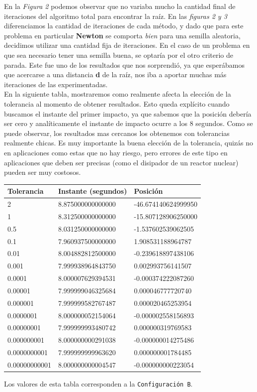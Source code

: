 \documentclass[a4paper]{article}
\begin{document}
En la \textit{Figura 2} podemos observar que no variaba mucho la cantidad final de iteraciones del algoritmo total para encontrar la raíz. En las \textit{figuras 2 y 3} diferenciamos la cantidad de iteraciones de cada método, y dado que para este problema en particular \textbf{Newton} se comporta \textit{bien} para una semilla aleatoria, decidimos utilizar una cantidad fija de iteraciones.
En el caso de un problema en que sea necesario tener una semilla buena, se optaría por el otro criterio de parada.
Este fue uno de los resultados que nos sorprendió, ya que esperábamos que acercarse a una distancia \textbf{d} de la raíz, nos iba a aportar muchas más iteraciones de las experimentadas.\\


En la siguiente tabla, mostraremos como realmente afecta la elección de la tolerancia al momento de obtener resultados. Esto queda explícito cuando buscamos el instante del primer impacto, ya que sabemos que la posición debería ser cero y analíticamente el instante de impacto ocurre a los 8 segundos. Como se puede observar, los resultados mas cercanos los obtenemos con tolerancias realmente chicas.
Es muy importante la buena elección de la tolerancia, quizás no en aplicaciones como estas que no hay riesgo, pero errores de este tipo en aplicaciones que deben ser precisas (como el disipador de un reactor nuclear) pueden ser muy costosos.

\vspace{2em}
\begin{center}
\begin{tabular}{|l|l|l|}
  \hline
  Tolerancia & Instante (segundos) & Posición \\
  \hline
  2 & 8.875000000000000 & -46.674140624999950 \\
  1 &  8.312500000000000 & -15.807128906250000 \\
  0.5 & 8.031250000000000 & -1.537602539062505 \\
  0.1 & 7.960937500000000 & 1.908531188964787 \\
  0.01 & 8.004882812500000 & -0.239618897438106 \\
  0.001 & 7.999938964843750 & 0.002993756141507 \\
  0.0001 & 8.000007629394531 & -0.000374222087260 \\
  0.00001 & 7.999999046325684 & 0.000046777720740 \\
  0.000001 & 7.999999582767487 & 0.000020465253954 \\
  0.0000001 & 8.000000052154064 & -0.000002558156893 \\
  0.00000001 & 7.999999993480742 & 0.000000319769583 \\
  0.000000001 & 8.000000000291038 & -0.000000014275486 \\
  0.0000000001 & 7.999999999963620 & 0.000000001784485 \\
  0.00000000001 & 8.000000000004547 & -0.000000000223054 \\
\hline
\end{tabular}
\end{center} 
\centerline{Los valores de esta tabla corresponden a la \texttt{Configuración B}. }
\vspace{1em}
\end{document}
